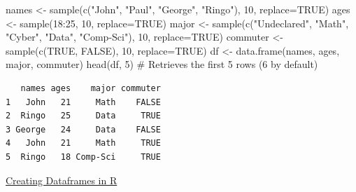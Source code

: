 \documentclass[
  letterpaper,
  DIV=11,
  numbers=noendperiod]{scrreprt}
\newenvironment{Shaded}{\begin{snugshade}}{\end{snugshade}}
\newcommand{\AttributeTok}[1]{\textcolor[rgb]{0.40,0.45,0.13}{#1}}
\newcommand{\CommentTok}[1]{\textcolor[rgb]{0.37,0.37,0.37}{#1}}
\newcommand{\ConstantTok}[1]{\textcolor[rgb]{0.56,0.35,0.01}{#1}}
\newcommand{\DecValTok}[1]{\textcolor[rgb]{0.68,0.00,0.00}{#1}}
\newcommand{\FunctionTok}[1]{\textcolor[rgb]{0.28,0.35,0.67}{#1}}
\newcommand{\NormalTok}[1]{\textcolor[rgb]{0.00,0.23,0.31}{#1}}
\newcommand{\OtherTok}[1]{\textcolor[rgb]{0.00,0.23,0.31}{#1}}
\newcommand{\SpecialCharTok}[1]{\textcolor[rgb]{0.37,0.37,0.37}{#1}}
\newcommand{\StringTok}[1]{\textcolor[rgb]{0.13,0.47,0.30}{#1}}
\begin{document}
\begin{Shaded}
\begin{Highlighting}[]
\NormalTok{names }\OtherTok{\textless{}{-}} \FunctionTok{sample}\NormalTok{(}\FunctionTok{c}\NormalTok{(}\StringTok{"John"}\NormalTok{, }\StringTok{"Paul"}\NormalTok{, }\StringTok{"George"}\NormalTok{, }\StringTok{"Ringo"}\NormalTok{), }\DecValTok{10}\NormalTok{, }\AttributeTok{replace=}\ConstantTok{TRUE}\NormalTok{)}
\NormalTok{ages }\OtherTok{\textless{}{-}} \FunctionTok{sample}\NormalTok{(}\DecValTok{18}\SpecialCharTok{:}\DecValTok{25}\NormalTok{, }\DecValTok{10}\NormalTok{, }\AttributeTok{replace=}\ConstantTok{TRUE}\NormalTok{)}
\NormalTok{major }\OtherTok{\textless{}{-}} \FunctionTok{sample}\NormalTok{(}\FunctionTok{c}\NormalTok{(}\StringTok{"Undeclared"}\NormalTok{, }\StringTok{"Math"}\NormalTok{, }\StringTok{"Cyber"}\NormalTok{, }\StringTok{"Data"}\NormalTok{, }\StringTok{"Comp{-}Sci"}\NormalTok{), }\DecValTok{10}\NormalTok{, }\AttributeTok{replace=}\ConstantTok{TRUE}\NormalTok{)}
\NormalTok{commuter }\OtherTok{\textless{}{-}} \FunctionTok{sample}\NormalTok{(}\FunctionTok{c}\NormalTok{(}\ConstantTok{TRUE}\NormalTok{, }\ConstantTok{FALSE}\NormalTok{), }\DecValTok{10}\NormalTok{, }\AttributeTok{replace=}\ConstantTok{TRUE}\NormalTok{)}
\NormalTok{df }\OtherTok{\textless{}{-}} \FunctionTok{data.frame}\NormalTok{(names, ages, major, commuter)}
\FunctionTok{head}\NormalTok{(df, }\DecValTok{5}\NormalTok{) }\CommentTok{\# Retrieves the first 5 rows (6 by default)}
\end{Highlighting}
\end{Shaded}

\begin{verbatim}
   names ages    major commuter
1   John   21     Math    FALSE
2  Ringo   25     Data     TRUE
3 George   24     Data    FALSE
4   John   21     Math     TRUE
5  Ringo   18 Comp-Sci     TRUE
\end{verbatim}

\begin{watch}{}{}
    \href{https://youtu.be/KjMZt7-YDVQ}{Creating Dataframes in R}
\end{watch}
\end{document}

